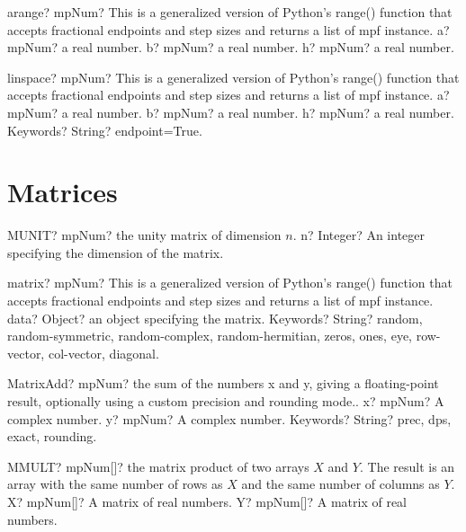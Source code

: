 \documentclass[12pt,a4paper,openany]{book}
\begin{document}
\begin{mpFunctionsExtract}
\mpFunctionThree
{arange? mpNum?  This is a generalized version of Python's range() function that accepts fractional endpoints and step sizes and returns a list of mpf instance.}
{a? mpNum? a real number.}
{b? mpNum? a real number.}
{h? mpNum? a real number.}
\end{mpFunctionsExtract}

\begin{mpFunctionsExtract}
\mpFunctionFour
{linspace? mpNum?  This is a generalized version of Python's range() function that accepts fractional endpoints and step sizes and returns a list of mpf instance.}
{a? mpNum? a real number.}
{b? mpNum? a real number.}
{h? mpNum? a real number.}
{Keywords? String? endpoint=True.}
\end{mpFunctionsExtract}

\section{Matrices}

\begin{mpFunctionsExtract}
\mpWorksheetFunctionOneNotImplemented
{MUNIT? mpNum? the unity matrix of dimension $n$.}
{n? Integer? An integer specifying the dimension of the matrix.}
\end{mpFunctionsExtract}

\begin{mpFunctionsExtract}
\mpFunctionTwo
{matrix? mpNum?  This is a generalized version of Python's range() function that accepts fractional endpoints and step sizes and returns a list of mpf instance.}
{data? Object? an object specifying the matrix.}
{Keywords? String? random, random-symmetric, random-complex, random-hermitian, zeros, ones, eye, row-vector, col-vector, diagonal.}
\end{mpFunctionsExtract}

\begin{mpFunctionsExtract}
\mpFunctionThree
{MatrixAdd? mpNum? the sum of the numbers x and y, giving a floating-point result, optionally using a custom precision and rounding mode..}
{x? mpNum? A complex number.}
{y? mpNum? A complex number.}
{Keywords? String? prec, dps, exact, rounding.}
\end{mpFunctionsExtract}

\begin{mpFunctionsExtract}
\mpWorksheetFunctionTwoNotImplemented
{MMULT? mpNum[]? the matrix product of two arrays $X$ and $Y$. The result is an array with the same number of rows as $X$ and the same number of columns as $Y$.}
{X? mpNum[]? A matrix of real numbers.}
{Y? mpNum[]? A matrix of real numbers.}
\end{mpFunctionsExtract}
\end{document}
